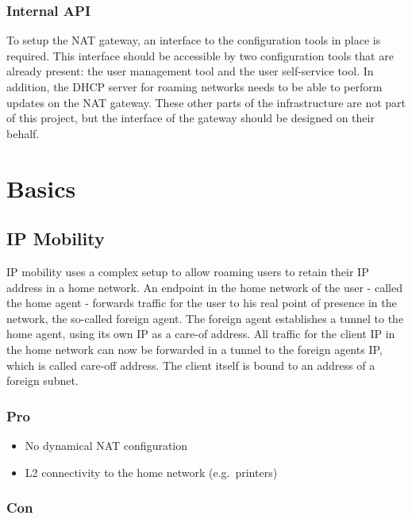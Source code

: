 \subsubsection{Internal API}\label{internal-api}

To setup the NAT gateway, an interface to the configuration tools in
place is required. This interface should be accessible by two
configuration tools that are already present: the user management tool
and the user self-service tool. In addition, the DHCP server for roaming
networks needs to be able to perform updates on the NAT gateway. These
other parts of the infrastructure are not part of this project, but the
interface of the gateway should be designed on their behalf.

\section{Basics}\label{basics}

\subsection{IP Mobility}\label{ip-mobility}

IP mobility uses a complex setup to allow roaming users to retain their
IP address in a home network. An endpoint in the home network of the
user - called the home agent - forwards traffic for the user to his real
point of presence in the network, the so-called foreign agent. The
foreign agent establishes a tunnel to the home agent, using its own IP
as a care-of address. All traffic for the client IP in the home network
can now be forwarded in a tunnel to the foreign agents IP, which is
called care-off address. The client itself is bound to an address of a
foreign subnet.

\subsubsection{Pro}\label{pro}

\begin{itemize}
\itemsep1pt\parskip0pt
\item
  No dynamical NAT configuration
\item
  L2 connectivity to the home network (e.g.~printers)
\end{itemize}

\subsubsection{Con}\label{con}

